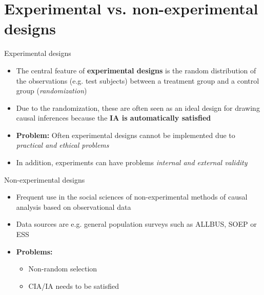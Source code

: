 \documentclass{beamer}\usepackage[]{graphicx}\usepackage[]{xcolor}
\begin{document}

\section{Experimental vs. non-experimental designs} %

\begin{frame}{Experimental designs}
  \begin{itemize}
  \item The central feature of \textbf{experimental designs} is the random distribution of the observations (e.g. test subjects) between a treatment group and a control group (\textit{randomization})
  \item Due to the randomization, these are often seen as an ideal design for drawing causal inferences because the \textbf{IA is automatically satisfied}
  \item \textbf{Problem:} Often experimental designs cannot be implemented due to \textit{practical and ethical problems}
  \item In addition, experiments can have problems \textit{internal and external validity}
  \end{itemize}
\end{frame}


\begin{frame}{Non-experimental designs}
  \begin{itemize}
    \item Frequent use in the social sciences of non-experimental methods of causal analysis based on observational data
    \item Data sources are e.g. general population surveys such as ALLBUS, SOEP or ESS
    \item \textbf{Problems:}
      \begin{itemize}  
        \item Non-random selection
        \item CIA/IA needs to be satisfied
      \end{itemize}
  \end{itemize}
\end{frame}
\end{document}
